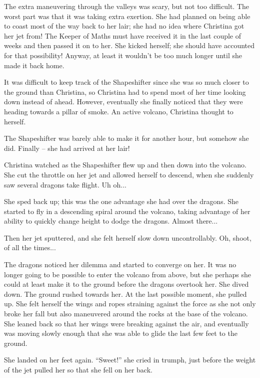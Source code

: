 \documentclass[showtrims,b6paper,draft,10pt]{memoir}
\begin{document}
The extra maneuvering through the valleys was scary, but not too difficult.  The worst part was that it was taking extra exertion.  She had planned on being able to coast most of the way back to her lair;  she had no idea where Christina got her jet from!  The Keeper of Maths must have received it in the last couple of weeks and then passed it on to her.  She kicked herself; she should have accounted for that possibility!  Anyway, at least it wouldn't be too much longer until she made it back home.

It was difficult to keep track of the Shapeshifter since she was so much closer to the ground than Christina, so Christina had to spend most of her time looking down instead of ahead.  However, eventually she finally noticed that they were heading towards a pillar of smoke.  An active volcano, Christina thought to herself.

\timeskip
The Shapeshifter was barely able to make it for another hour, but somehow she did.  Finally -- she had arrived at her lair!

Christina watched as the Shapeshifter flew up and then down into the volcano.  She cut the throttle on her jet and allowed herself to descend, when she suddenly saw several dragons take flight.  Uh oh...

She sped back up;  this was the one advantage she had over the dragons.  She started to fly in a descending spiral around the volcano, taking advantage of her ability to quickly change height to dodge the dragons.  Almost there...

Then her jet sputtered, and she felt herself slow down uncontrollably.  Oh, shoot, of all the times...

The dragons noticed her dilemma and started to converge on her.  It was no longer going to be possible to enter the volcano from above, but she perhaps she could at least make it to the ground before the dragons overtook her.  She dived down.  The ground rushed towards her.  At the last possible moment, she pulled up.  She felt herself the wings and ropes straining against the force as she not only broke her fall but also maneuvered around the rocks at the base of the volcano.  She leaned back so that her wings were breaking against the air, and eventually was moving slowly enough that she was able to glide the last few feet to the ground.

She landed on her feet again.  ``Sweet!''  she cried in trumph, just before the weight of the jet pulled her so that she fell on her back.
\end{document}
